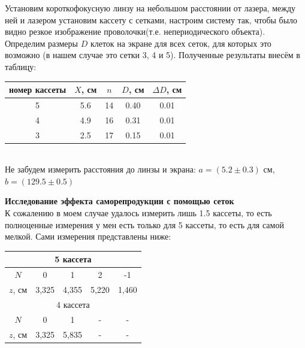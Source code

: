 \documentclass[a4paper,12pt]{extarticle}
\begin{document}
Установим короткофокусную линзу на небольшом расстоянии от лазера,
между ней и лазером установим кассету с сетками, настроим систему так,
чтобы было видно резкое изображение проволочки(т.е. непериодического
объекта). Определим размеры $D$ клеток на экране для всех сеток, для
которых это возможно (в нашем случае это сетки 3, 4 и 5). Полученные
результаты внесём в таблицу:\\
\begin{tabular}{|c|c|c|c|c|}
\hline
номер кассеты & $X$, см   & $n$  & $D$, см  & $\Delta D$, см   \\ \hline
5  & 5.6 & 14 & 0.40 & 0.01  \\ \hline
4  & 4.9 & 16 & 0.31 & 0.01  \\ \hline
3  & 2.5 & 17 & 0.15 & 0.01  \\ \hline
\end{tabular} \\
Не забудем измерить расстояния до линзы и экрана: $a = (5.2\pm0.3)$ см, $b = (129.5\pm0.5)$
\newpage

\textbf{\uppercase\expandafter{} Исследование эффекта саморепродукции с помощью сеток}\\ 
К сожалению в моем случае удалось измерить лишь 1.5 кассеты, то есть полноценные измерения у мен есть только для 5 кассеты, то есть для самой мелкой. Сами измерения представлены ниже: \\
\begin{tabular}{|ccccc|}
\hline
\multicolumn{5}{|c|}{5 кассета}                                                                                        \\ \hline
\multicolumn{1}{|c|}{$N$} & \multicolumn{1}{c|}{0}     & \multicolumn{1}{c|}{1}     & \multicolumn{1}{c|}{2}     & -1    \\ \hline
\multicolumn{1}{|c|}{$z$, см} & \multicolumn{1}{c|}{3,325} & \multicolumn{1}{c|}{4,355} & \multicolumn{1}{c|}{5,220} & 1,460 \\ \hline
\multicolumn{5}{|c|}{4 кассета}                                                                                        \\ \hline
\multicolumn{1}{|c|}{$N$} & \multicolumn{1}{c|}{0}     & \multicolumn{1}{c|}{1}     & \multicolumn{1}{c|}{-}     & -     \\ \hline
\multicolumn{1}{|c|}{$z$, см} & \multicolumn{1}{c|}{3,325} & \multicolumn{1}{c|}{5,835} & \multicolumn{1}{c|}{-}     & -     \\ \hline
\end{tabular} \\ \\
\end{document}
